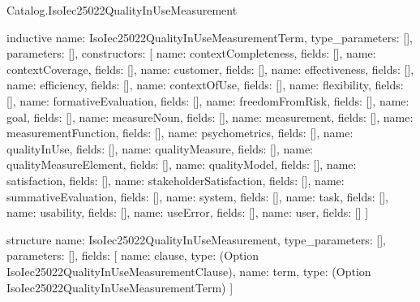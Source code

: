 \begin{lexlean}{Catalog.IsoIec25022QualityInUseMeasurement}
\begin{semanticmodule}
inductive{
  name: IsoIec25022QualityInUseMeasurementTerm,
  type_parameters: [],
  parameters: [],
  constructors: [
    {name: contextCompleteness, fields: []},
    {name: contextCoverage, fields: []},
    {name: customer, fields: []},
    {name: effectiveness, fields: []},
    {name: efficiency, fields: []},
    {name: contextOfUse, fields: []},
    {name: flexibility, fields: []},
    {name: formativeEvaluation, fields: []},
    {name: freedomFromRisk, fields: []},
    {name: goal, fields: []},
    {name: measureNoun, fields: []},
    {name: measurement, fields: []},
    {name: measurementFunction, fields: []},
    {name: psychometrics, fields: []},
    {name: qualityInUse, fields: []},
    {name: qualityMeasure, fields: []},
    {name: qualityMeasureElement, fields: []},
    {name: qualityModel, fields: []},
    {name: satisfaction, fields: []},
    {name: stakeholderSatisfaction, fields: []},
    {name: summativeEvaluation, fields: []},
    {name: system, fields: []},
    {name: task, fields: []},
    {name: usability, fields: []},
    {name: useError, fields: []},
    {name: user, fields: []}
  ]
}

structure{
  name: IsoIec25022QualityInUseMeasurement,
  type_parameters: [],
  parameters: [],
  fields: [
    {name: clause, type: (Option IsoIec25022QualityInUseMeasurementClause)},
    {name: term, type: (Option IsoIec25022QualityInUseMeasurementTerm)}
  ]
}
\end{semanticmodule}
\end{lexlean}
